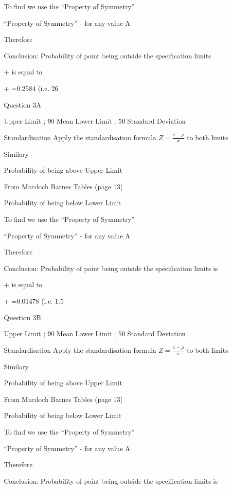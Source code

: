 ﻿\documentclass[]{report}
\begin{document}
To find   we use the “Property of Symmetry”

“Property of Symmetry” -   for any value A

Therefore 

Conclusion: 
Probability of point being outside the specification limits 

+ is equal to

+ =0.2584 	(i.e. 26%



Question 3A

Upper Limit ; 90		Mean		 	
Lower Limit ; 50		Standard Deviation	 

Standardisation
Apply the standardisation formula	$Z=\frac{x-\mu}{\sigma} $ 	to both limits


Similary



Probability of being above Upper Limit

From Murdoch Barnes Tables (page 13)  

Probability of being below Lower Limit


To find   we use the “Property of Symmetry”

“Property of Symmetry” -   for any value A

Therefore 

Conclusion: 
Probability of point being outside the specification limits is

+ is equal to


+ =0.01478  	(i.e. 1.5%






Question 3B

Upper Limit ; 90		Mean		 	
Lower Limit ; 50		Standard Deviation	 

Standardisation
Apply the standardisation formula	$Z=\frac{x-\mu}{\sigma} $ 	to both limits


Similary



Probability of being above Upper Limit

From Murdoch Barnes Tables (page 13)  

Probability of being below Lower Limit


To find   we use the “Property of Symmetry”

“Property of Symmetry” -   for any value A

Therefore 

Conclusion: 
Probability of point being outside the specification limits is
\end{document}
